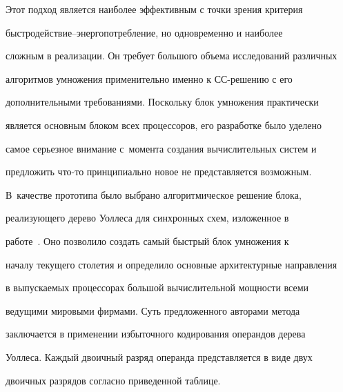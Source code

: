 \vspace*{-2pt}



      Этот подход является наиболее эффективным с точки зрения критерия

быст\-ро\-дей\-ст\-вие--энер\-го\-по\-треб\-ле\-ние, но одновременно и наиболее

сложным в реализации. Он требует большого объема исследований различных

алгоритмов умножения применительно именно к СС-ре\-ше\-нию с его

дополнительными требованиями. Поскольку блок умножения практически

является основным блоком всех процессоров, его разработке было уделено

самое серьезное внимание с~момента создания вычислительных сис\-тем и

предложить что-то принципиально новое не представляется возможным.

В~качестве прототипа было выбрано алгоритмическое решение блока,

реализующего дерево Уоллеса для синхронных схем, изложенное в

работе~\cite{3-st1}. Оно позволило создать самый быстрый блок умножения к

началу текущего столетия и определило основные архитектурные направления

в выпускаемых процессорах большой вычислительной мощности всеми

ведущими мировыми фирмами. Суть предложенного авторами метода

заключается в применении избыточного кодирования операндов дерева

Уоллеса. Каждый двоичный разряд операнда представляется в виде двух

двоичных разрядов согласно приведенной таблице.



